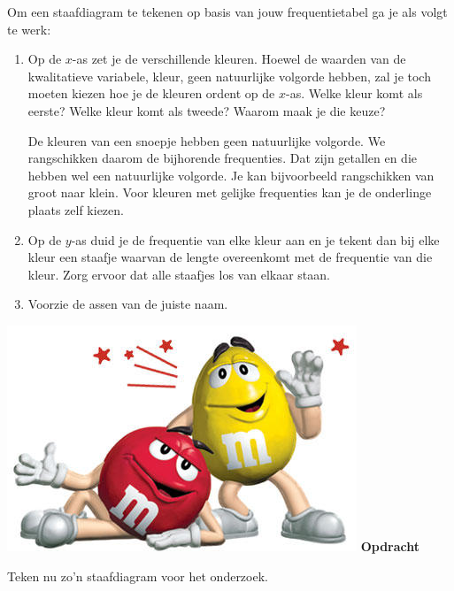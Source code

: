 \documentclass[12pt,twoside]{article}
\newcounter{nmmopdracht}
\newenvironment{mmopdracht}
{
  \stepcounter{nmmopdracht}
  \vspace*{0.7cm}
  \begin{minipage}{\textwidth}
  {%
  \hspace*{-\marginparwidth}\includegraphics[width=\marginparwidth]{mmopdracht}
  \large\bf Opdracht \arabic{nmmopdracht}}
}{%
  \end{minipage}
}
\begin{document}
Om een staafdiagram te tekenen op basis van jouw frequentietabel ga je als volgt te werk:
\begin{enumerate}
  \item Op de $x$-as zet je de verschillende kleuren. Hoewel de waarden van de kwalitatieve variabele, kleur, geen natuurlijke volgorde hebben, zal je toch moeten kiezen hoe je de kleuren ordent op de $x$-as. Welke kleur komt als eerste? Welke kleur komt als tweede? Waarom maak je die keuze?

De kleuren van een snoepje hebben geen natuurlijke volgorde. We rangschikken daarom de
bijhorende frequenties. Dat zijn getallen en die hebben wel een natuurlijke volgorde. Je kan
bijvoorbeeld rangschikken van groot naar klein. Voor kleuren met gelijke frequenties kan je
de onderlinge plaats zelf kiezen.
\item Op de $y$-as duid je de frequentie van elke kleur aan en je tekent dan bij elke kleur een staafje
waarvan de lengte overeenkomt met de frequentie van die kleur. Zorg ervoor dat alle staafjes
los van elkaar staan.
\item Voorzie de assen van de juiste naam.
\end{enumerate}

\begin{mmopdracht}
Teken nu zo’n staafdiagram voor het onderzoek.
\begin{center}
\end{center}
\end{mmopdracht}
\end{document}
